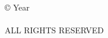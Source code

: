 \null
\vfill
\begin{flushleft}
\copyright\; Year\\
\studentname\\
ALL RIGHTS RESERVED
\end{flushleft}